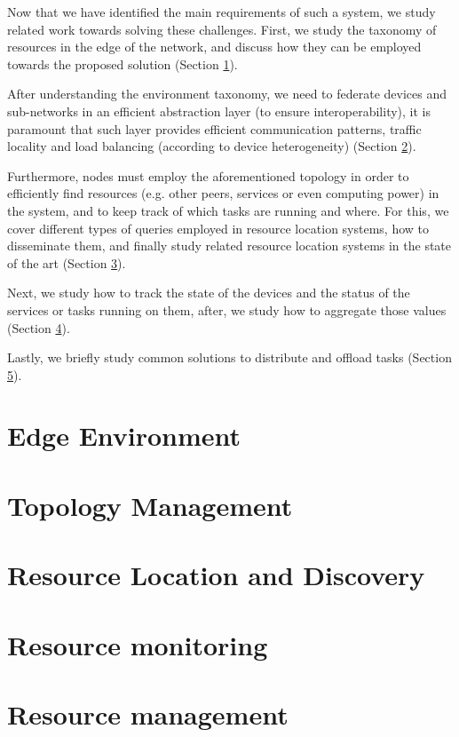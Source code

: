 Now that we have identified the main requirements of such a system, we study related work towards solving these challenges. First, we study the taxonomy of resources in the edge of the network, and discuss how they can be employed towards the proposed solution (Section \ref{sec:edge_computing}).

After understanding the environment taxonomy, we need to federate devices and sub-networks in an efficient abstraction layer (to ensure interoperability), it is paramount that such layer provides efficient communication patterns, traffic locality and load balancing (according to device heterogeneity) (Section \ref{sec:topology_management}).

Furthermore, nodes must employ the aforementioned topology in order to efficiently find resources (e.g. other peers, services or even computing power) in the system, and to keep track of which tasks are running and where. For this, we cover different types of queries employed in resource location systems, how to disseminate them, and finally study related resource location systems in the state of the art (Section \ref{sec:res_location}).

Next, we study how to track the state of the devices and the status of the services or tasks running on them, after, we study how to aggregate those values (Section \ref{sec:res_monitoring}). 

Lastly, we briefly study common solutions to distribute and offload tasks (Section \ref{sec:res_management}). 

\section{Edge Environment} \label{sec:edge_computing} 

\section{Topology Management} \label{sec:topology_management} 

\section{Resource Location and Discovery} \label{sec:res_location} 

\section{Resource monitoring} \label{sec:res_monitoring} 

\section{Resource management} \label{sec:res_management} 


